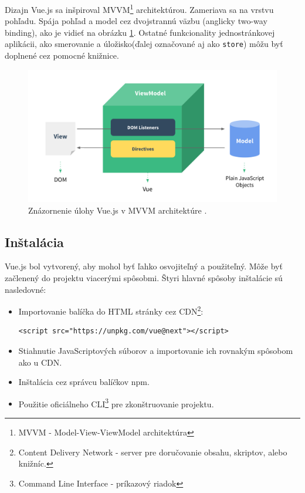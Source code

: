 Dizajn Vue.js sa inšpiroval MVVM\footnote{MVVM - Model-View-ViewModel architektúra} architektúrou. Zameriava sa na vrstvu pohľadu. Spája pohľad a model cez dvojstrannú väzbu (anglicky two-way binding), ako je vidieť na obrázku \ref{pic:mvvm}. Ostatné funkcionality jednostránkovej aplikácii, ako smerovanie a úložisko(ďalej označované aj ako \texttt{store}) môžu byť doplnené cez pomocné knižnice.
    \begin{figure}[!hbt]
        \centering
        \includegraphics[scale=0.2]{obrazky/mvvm.png}
        \caption{Znázornenie úlohy Vue.js v MVVM architektúre \cite{vue-guide}.}
        \label{pic:mvvm}
    \end{figure}

\subsection*{Inštalácia}
Vue.js bol vytvorený, aby mohol byť ľahko osvojiteľný a použiteľný. Môže byť začlenený do projektu viacerými spôsobmi. Štyri hlavné spôsoby inštalácie sú nasledovné:
    \begin{itemize}
        \item Importovanie balíčka do HTML stránky cez CDN\footnote{Content Delivery Network - server pre doručovanie obsahu, skriptov, alebo knižníc.}:
        \begin{verbatim}<script src="https://unpkg.com/vue@next"></script>\end{verbatim}
        \item Stiahnutie JavaScriptových súborov a importovanie ich rovnakým spôsobom ako u CDN.
        \item Inštalácia cez správcu balíčkov npm.
        \item Použitie oficiálneho CLI\footnote{Command Line Interface - príkazový riadok} pre zkonštruovanie projektu.
    \end{itemize}
    
